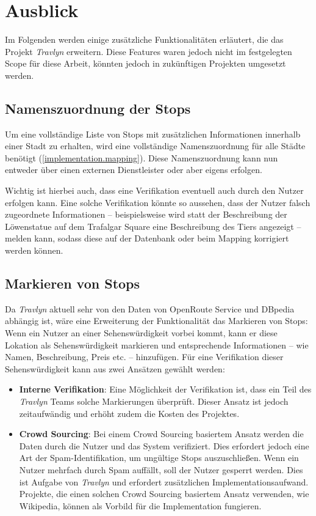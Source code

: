 \chapter{Ausblick}

	Im Folgenden werden einige zusätzliche Funktionalitäten erläutert, die das Projekt \textit{Travlyn} erweitern. Diese Features waren jedoch nicht im festgelegten Scope für diese Arbeit, könnten jedoch in zukünftigen Projekten umgesetzt werden. 
	
	\section{Namenszuordnung der Stops}
	
		Um eine vollständige Liste von Stops mit zusätzlichen Informationen innerhalb einer Stadt zu erhalten, wird eine vollständige Namenszuordnung für alle Städte benötigt (\autoref{implementation.mapping}). Diese Namenszuordnung kann nun entweder über einen externen Dienstleister oder aber eigens erfolgen. 
		
		Wichtig ist hierbei auch, dass eine Verifikation eventuell auch durch den Nutzer erfolgen kann. Eine solche Verifikation könnte so aussehen, dass der Nutzer falsch zugeordnete Informationen -- beispielsweise wird statt der Beschreibung der Löwenstatue auf dem Trafalgar Square eine Beschreibung des Tiers angezeigt -- melden kann, sodass diese auf der Datenbank oder beim Mapping korrigiert werden können. 
		
	\section{Markieren von Stops}
	
		Da \textit{Travlyn} aktuell sehr von den Daten von OpenRoute Service und DBpedia abhängig ist, wäre eine Erweiterung der Funktionalität das Markieren von Stops: Wenn ein Nutzer an einer Sehenswürdigkeit vorbei kommt, kann er diese Lokation als Sehenswürdigkeit markieren und entsprechende Informationen -- wie Namen, Beschreibung, Preis etc. -- hinzufügen. Für eine Verifikation dieser Sehenswürdigkeit kann aus zwei Ansätzen gewählt werden: 
		
		\begin{itemize}
			\item \textbf{Interne Verifikation}: Eine Möglichkeit der Verifikation ist, dass ein Teil des \textit{Travlyn} Teams solche Markierungen überprüft. Dieser Ansatz ist jedoch zeitaufwändig und erhöht zudem die Kosten des Projektes. 
			\item \textbf{Crowd Sourcing}: Bei einem Crowd Sourcing basiertem Ansatz werden die Daten durch die Nutzer und das System verifiziert. Dies erfordert jedoch eine Art der Spam-Identifikation, um ungültige Stops auszuschließen. Wenn ein Nutzer mehrfach durch Spam auffällt, soll der Nutzer gesperrt werden. Dies ist Aufgabe von \textit{Travlyn} und erfordert zusätzlichen Implementationsaufwand. Projekte, die einen solchen Crowd Sourcing basiertem Ansatz verwenden, wie Wikipedia, können als Vorbild für die Implementation fungieren. 
		\end{itemize}
	
